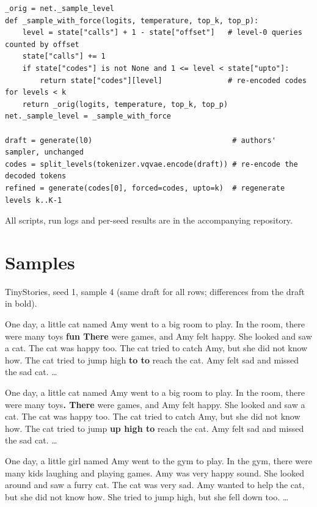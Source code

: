 \documentclass[10pt]{article}
\newcommand{\RT}[1]{\mathrm{RT}_{#1}}
\begin{document}
\begin{verbatim}
_orig = net._sample_level
def _sample_with_force(logits, temperature, top_k, top_p):
    level = state["calls"] + 1 - state["offset"]   # level-0 queries counted by offset
    state["calls"] += 1
    if state["codes"] is not None and 1 <= level < state["upto"]:
        return state["codes"][level]               # re-encoded codes for levels < k
    return _orig(logits, temperature, top_k, top_p)
net._sample_level = _sample_with_force

draft = generate(l0)                                # authors' sampler, unchanged
codes = split_levels(tokenizer.vqvae.encode(draft)) # re-encode the decoded tokens
refined = generate(codes[0], forced=codes, upto=k)  # regenerate levels k..K-1
\end{verbatim}

All scripts, run logs and per-seed results are in the accompanying repository.

\section{Samples}
\label{app:samples}

TinyStories, seed 1, sample 4 (same draft for all rows; differences from the draft in bold).

\begin{description}\small
\item[Draft (released sampler).] One day, a little cat named Amy went to a big room to play. In the room, there were many toys \textbf{fun There} were games, and Amy felt happy. She looked and saw a cat. The cat was happy too. The cat tried to catch Amy, but she did not know how. The cat tried to jump high \textbf{to to} reach the cat. Amy felt sad and missed the sad cat. \dots
\item[$\RT{6}$.] One day, a little cat named Amy went to a big room to play. In the room, there were many toys\textbf{. There} were games, and Amy felt happy. She looked and saw a cat. The cat was happy too. The cat tried to catch Amy, but she did not know how. The cat tried to jump \textbf{up high to} reach the cat. Amy felt sad and missed the sad cat. \dots
\item[$\RT{3}{+}\RT{6}{+}\RT{9}$.] One day, a little girl named Amy went to the gym to play. In the gym, there were many kids laughing and playing games. Amy was very happy sound. She looked around and saw a furry cat. The cat was very sad. Amy wanted to help the cat, but she did not know how. She tried to jump high, but she fell down too. \dots
\end{description}
\end{document}
